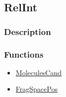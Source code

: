 \subsection{RelInt}\label{RelInt}
\subsubsection{Description}


\subsubsection{Functions}
\begin{itemize}
\item \hyperref[MoleculesCand]{MoleculesCand}
\item \hyperref[FragSpacePos]{FragSpacePos}
\end{itemize}

